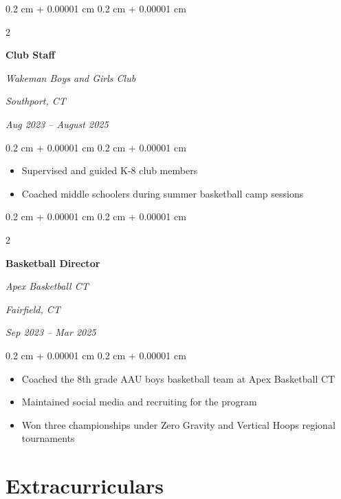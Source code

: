 \documentclass[10pt, letterpaper]{article}
\newenvironment{highlights}{
    \begin{itemize}[
        topsep=0.10 cm,
        parsep=0.10 cm,
        partopsep=0pt,
        itemsep=0pt,
        leftmargin=0.4 cm + 10pt
    ]
}{
    \end{itemize}
} %
\newenvironment{onecolentry}{
    \begin{adjustwidth}{
        0.2 cm + 0.00001 cm
    }{
        0.2 cm + 0.00001 cm
    }
}{
    \end{adjustwidth}
} %
\newenvironment{twocolentry}[2][]{
    \onecolentry
    \def\secondColumn{#2}
    \setcolumnwidth{\fill, 4.5 cm}
    \begin{paracol}{2}
}{
    \switchcolumn \raggedleft \secondColumn
    \end{paracol}
    \endonecolentry
} %
\begin{document}
         
        \begin{twocolentry}{
            \textit{Southport, CT}    
                
            \textit{Aug 2023 – August 2025}}
                \textbf{Club Staff}
                
                \textit{Wakeman Boys and Girls Club}
            \end{twocolentry}
    
            \vspace{0.10 cm}
            \begin{onecolentry}
                \begin{highlights}
                    \item Supervised and guided K-8 club members
                    \item Coached middle schoolers during summer basketball camp sessions
                \end{highlights}
            \end{onecolentry}

        \vspace{0.2 cm}


        \begin{twocolentry}{
        \textit{Fairfield, CT}    
            
        \textit{Sep 2023 – Mar 2025}}
            \textbf{Basketball Director}
            
            \textit{Apex Basketball CT}
        \end{twocolentry}

        \vspace{0.10 cm}
        \begin{onecolentry}
            \begin{highlights}
                \item Coached the 8th grade AAU boys basketball team at Apex Basketball CT
                \item Maintained social media and recruiting for the program
                \item Won three championships under Zero Gravity and Vertical Hoops regional tournaments
            \end{highlights}
        \end{onecolentry}

       
       
 

    \section{Extracurriculars}
    
\end{document}

